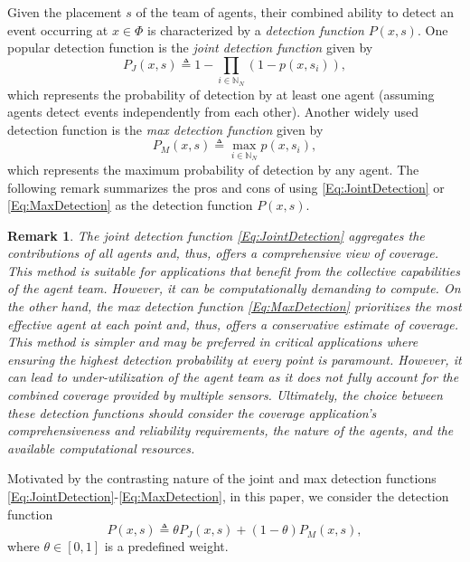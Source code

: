 \documentclass[letterpaper, 10 pt, conference]{ieeeconf}
\newcommand{\N}{\mathbb{N}}
\newtheorem{remark}{Remark}
\begin{document}
Given the placement $s$ of the team of agents, their combined ability to detect an event occurring at $x \in \Phi$ is characterized by a \emph{detection function} $P(x,s)$. One popular detection function is the \emph{joint detection function} given by 
\begin{equation}\label{Eq:JointDetection}
P_J(x,s) \triangleq 1-\prod_{i\in\N_N}(1-p(x,s_i)),
\end{equation}
which represents the probability of detection by at least one agent (assuming agents detect events independently from each other). Another widely used detection function is the \emph{max detection function} given by 
\begin{equation}\label{Eq:MaxDetection}
P_M(x,s) \triangleq \max_{i\in\N_N} p(x,s_i),
\end{equation}
which represents the maximum probability of detection by any agent. The following remark summarizes the pros and cons of using \eqref{Eq:JointDetection} or \eqref{Eq:MaxDetection} as the detection function $P(x,s)$.  

\begin{remark}\label{Rm:DetectionFunction}
The joint detection function \eqref{Eq:JointDetection} aggregates the contributions of all agents and, thus, offers a comprehensive view of coverage. This method is suitable for applications that benefit from the collective capabilities of the agent team. However, it can be computationally demanding to compute. 
On the other hand, the max detection function \eqref{Eq:MaxDetection} prioritizes the most effective agent at each point and, thus, offers a conservative estimate of coverage. This method is simpler and may be preferred in critical applications where ensuring the highest detection probability at every point is paramount. However, it can lead to under-utilization of the agent team as it does not fully account for the combined coverage provided by multiple sensors.
Ultimately, the choice between these detection functions should consider the coverage application's comprehensiveness and reliability requirements, the nature of the agents, and the available computational resources.
\end{remark}

Motivated by the contrasting nature of the joint and max detection functions \eqref{Eq:JointDetection}-\eqref{Eq:MaxDetection}, in this paper, we consider the detection function
\begin{equation}\label{Eq:DetectionFunction}
    P(x,s) \triangleq \theta P_J(x,s) + (1-\theta) P_M(x,s),
\end{equation}
where $\theta\in[0,1]$ is a predefined weight. 
\end{document}
